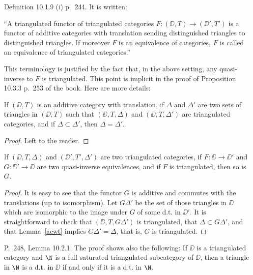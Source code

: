\documentclass[12pt]{article}
\theoremstyle{remark}
\theoremstyle{definition}
\begin{document}
\begin{s}
Definition 10.1.9 (i) p.~244. It is written:

``A triangulated functor of triangulated categories $F:(\DD,T)\to(\DD',T')$ is a functor of additive categories with translation sending distinguished triangles to distinguished triangles. If moreover $F$ is an equivalence of categories, $F$ is called an equivalence of triangulated categories.''

This terminology is justified by the fact that, in the above setting, any quasi-inverse to $F$ is triangulated. This point is implicit in the proof of Proposition 10.3.3 p.~253 of the book. Here are more details:

\begin{lem}
If $(\DD,T)$ is an additive category with translation, if $\Delta$ and $\Delta'$ are two sets of triangles in $(\DD,T)$ such that $(\DD,T,\Delta)$ and $(\DD,T,\Delta')$ are triangulated categories, and if $\Delta\subset\Delta'$, then $\Delta=\Delta'$. 
\end{lem}
\begin{proof}
Left to the reader. 
\end{proof}
\begin{lem}
If $(\DD,T,\Delta)$ and $(\DD',T',\Delta')$ are two triangulated categories, if $F:\DD\to\DD'$ and $G:\DD'\to\DD$ are two quasi-inverse equivalences, and if $F$ is triangulated, then so is $G$.
\end{lem}
\begin{proof}
It is easy to see that the functor $G$ is additive and commutes with the translations (up to isomorphism). Let $G\Delta'$ be the set of those triangles in $\DD$ which are isomorphic to the image under $G$ of some d.t. in $\DD'$. It is straightforward to check that $(\DD,T,G\Delta')$ is triangulated, that $\Delta\subset G\Delta'$, and that Lemma~\ref{acwt} implies $G\Delta'=\Delta$, that is, $G$ is triangulated.
\end{proof}
\end{s}

%

\begin{s} 
P.~248, Lemma 10.2.1. The proof shows also the following: If $\DD$ is a triangulated category and $\N$ is a full saturated triangulated subcategory of $\DD$, then a triangle in $\N$ is a d.t. in $\DD$ if and only if it is a d.t. in $\N$.
\end{s}

%
\end{document}
